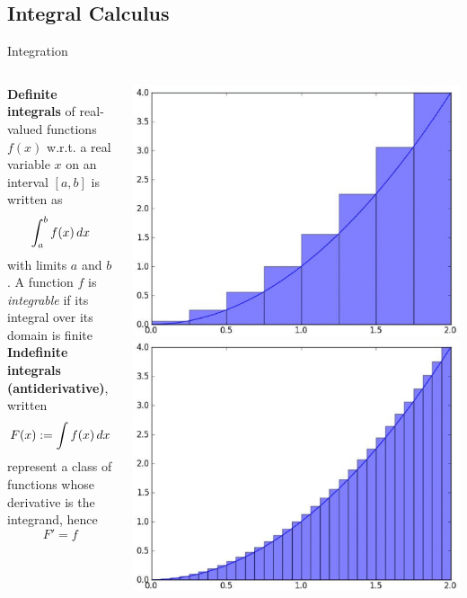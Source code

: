 \subsection{Integral Calculus}

\begin{frame}{Integration}
    \begin{columns}[onlytextwidth]
        \begin{column}{0.73\textwidth}
            \textbf{Definite integrals} of real-valued functions $f(x)$ w.r.t. a real variable $x$ on an interval $[a, b]$ is written as
            $$\int_a^b f(x) \mathop{dx}$$
            with limits $a$ and $b$. A function $f$ is \emph{integrable} if its integral over its domain is finite\\[5mm]

            \textbf{Indefinite integrals (antiderivative)}, written
            $$F(x) := \int f(x) \mathop{dx}$$
            represent a class of functions whose derivative is the integrand, hence
            $$F' = f$$
        \end{column}
        \begin{column}{0.2\textwidth}
            \includegraphics[width=1\textwidth]{fig/riemann-2.eps}
            \includegraphics[width=1\textwidth]{fig/riemann-4.eps}

\end{column}
\end{columns}
\end{frame}
